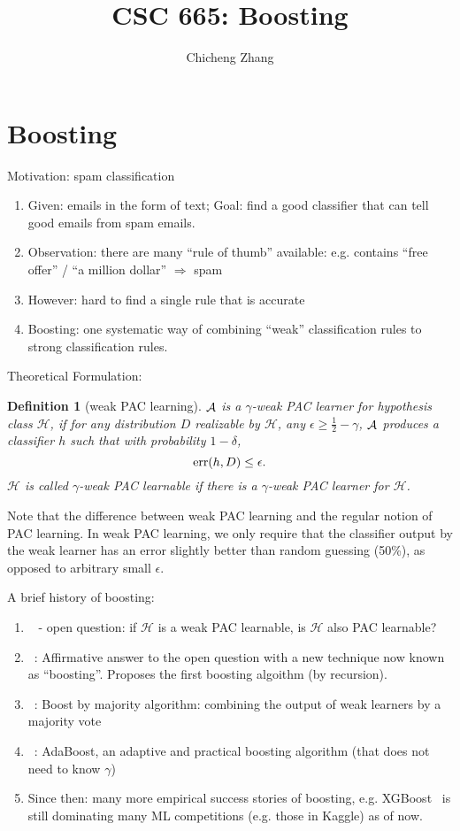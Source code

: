 \documentclass{article}
\title{CSC 665: Boosting}
\author{Chicheng Zhang}
\newtheorem{definition}{Definition}
\DeclareMathOperator*{\err}{{\rm err}}
\DeclareMathOperator*{\Acal}{{\cal A}}
\newcommand{\Hcal}{\mathcal{H}}
\begin{document}
\maketitle

\section{Boosting}

Motivation: spam classification
\begin{enumerate}
\item Given: emails in the form of text; Goal: find a good classifier that can tell good emails from spam emails.
\item Observation: there are many ``rule of thumb'' available: e.g. contains ``free offer'' / ``a million dollar'' $\Rightarrow$ spam
\item However: hard to find a single rule that is accurate
\item Boosting: one systematic way of combining ``weak'' classification rules to strong classification rules.
\end{enumerate}

Theoretical Formulation:

\begin{definition}[weak PAC learning] $\Acal$ is a $\gamma$-weak PAC learner for hypothesis class $\Hcal$, if for any distribution $D$ realizable by $\Hcal$, any $\epsilon \geq \frac{1}{2}-\gamma$, $\Acal$ produces a classifier $h$ such that with probability $1-\delta$,
\[ \err(h, D) \leq \epsilon. \]
$\Hcal$ is called $\gamma$-weak PAC learnable if there is a $\gamma$-weak PAC learner for $\Hcal$.
\end{definition}

Note that the difference between weak PAC learning and the regular notion of PAC learning. In weak PAC learning, we only require that the classifier output by the weak learner has an error slightly better than random guessing (50\%), as opposed to arbitrary small $\epsilon$.

A brief history of boosting:
\begin{enumerate}
\item ~\citep{kearns88} - open question: if $\Hcal$ is a weak PAC learnable, is $\Hcal$ also PAC learnable?
\item ~\citep{schapire1990strength}: Affirmative answer to the open question with a new technique now known as ``boosting''. Proposes the first boosting algoithm (by recursion).
\item ~\citep{freundboosting}: Boost by majority algorithm: combining the output of weak learners by a majority vote
\item ~\citep{freund1997decision}: AdaBoost, an adaptive and practical boosting algorithm (that does not need to know $\gamma$)
\item Since then: many more empirical success stories of boosting, e.g. XGBoost~\citep{chen2016xgboost} is still dominating many ML competitions (e.g. those in Kaggle) as of now.
\end{enumerate}
\end{document}
